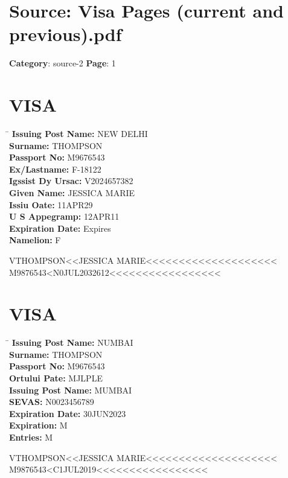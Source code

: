 \section*{Source: Visa Pages (current and previous).pdf}
\textbf{Category}: source-2
\textbf{Page}: 1

\section*{VISA}

\begin{tabbing}
\hspace{5cm} \= \kill
\textbf{Issuing Post Name:} \> NEW DELHI \\
\textbf{Surname:} \> THOMPSON \\
\textbf{Passport No:} \> M9676543 \\
\textbf{Ex/Lastname:} \> F-18122 \\
\textbf{Igssist Dy Ursac:} \> V2024657382 \\
\textbf{Given Name:} \> JESSICA MARIE \\
\textbf{Issiu Oate:} \> 11APR29 \\
\textbf{U S Appegramp:} \> 12APR11 \\
\textbf{Expiration Date:} \> Expires \\
\textbf{Namelion:} \> F \\
\end{tabbing}

VTHOMPSON<<JESSICA MARIE<<<<<<<<<<<<<<<<<<<<\\
M9876543<N0JUL2032612<<<<<<<<<<<<<<<<<

\section*{VISA}

\begin{tabbing}
\hspace{5cm} \= \kill
\textbf{Issuing Post Name:} \> NUMBAI \\
\textbf{Surname:} \> THOMPSON \\
\textbf{Passport No:} \> M9676543 \\
\textbf{Ortului Pate:} \> MJLPLE \\
\textbf{Issuing Post Name:} \> MUMBAI \\
\textbf{SEVAS:} \> N0023456789 \\
\textbf{Expiration Date:} \> 30JUN2023 \\
\textbf{Expiration:} \> M \\
\textbf{Entries:} \> M \\
\end{tabbing}

VTHOMPSON<<JESSICA MARIE<<<<<<<<<<<<<<<<<<<<\\
M9876543<C1JUL2019<<<<<<<<<<<<<<<<<